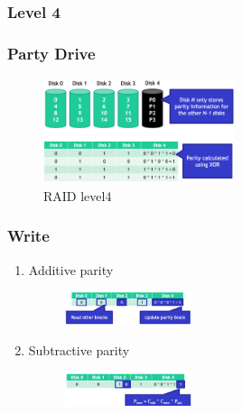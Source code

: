 \documentclass[10pt, oneside]{article}
\begin{document}
\subsubsection{Level 4}
\subsubsection*{Party Drive}
\begin{figure}[H]
    \begin{center}
    \includegraphics[width=0.5\textwidth]{img/img72.png}
    \caption{RAID level4}
    \end{center}
\end{figure}
\subsubsection*{Write}
\begin{enumerate}
    \item Additive parity
    \begin{figure}[H]
        \begin{center}
        \includegraphics[width=0.35\textwidth]{img/img73.png}
        \end{center}
    \end{figure}
    \item Subtractive parity
    \begin{figure}[H]
        \begin{center}
        \includegraphics[width=0.35\textwidth]{img/img74.png}
        \end{center}
    \end{figure}
\end{enumerate}
\end{document}
